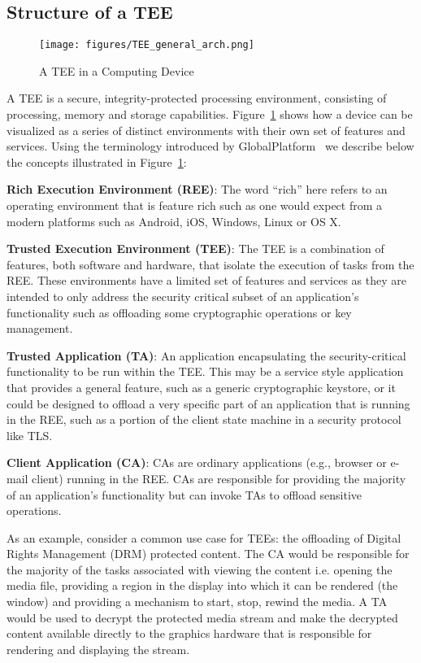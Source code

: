 \documentclass[10pt,conference,letterpaper]{IEEEtran}
\begin{document}
\subsection{Structure  of a TEE}
\begin{figure}[tb]
\centering
\texttt{[image: figures/TEE\_general\_arch.png]}
\caption{A TEE in a Computing Device}
\label{fig:teearch}
\end{figure}

A TEE is a secure, integrity-protected processing environment, consisting of processing, memory and storage capabilities. Figure~\ref{fig:teearch} shows how a device can be visualized as a series of distinct environments with their own set of features and services. Using the terminology introduced by GlobalPlatform~\cite{web:GP_TEE_SA} we describe below the concepts illustrated in Figure~\ref{fig:teearch}:

\noindent\textbf{Rich Execution Environment (REE)}: The word ``rich'' here refers to an operating environment that is feature rich such as one would expect from a modern platforms such as Android, iOS, Windows, Linux or OS X.  

\noindent\textbf{Trusted Execution Environment (TEE)}: The TEE is a combination of features, both software and hardware, that isolate the execution of tasks from the REE.  These environments have a limited set of features and services as they are intended to only address the security critical subset of an application's functionality such as offloading some cryptographic operations or key management.

\noindent\textbf{Trusted Application (TA)}: An application encapsulating the security-critical functionality to be run within the TEE. This may be a service style application that provides a general feature, such as a generic cryptographic keystore, or it could be designed to offload a very specific part of an application that is running in the REE, such as a portion of the client state machine in a security protocol like TLS.

\noindent\textbf{Client Application (CA)}: CAs are ordinary applications (e.g., browser or e-mail client) running in the REE. CAs are responsible for providing the majority of an application's functionality but can invoke TAs to offload sensitive operations.

As an example, consider a common use case for TEEs: the offloading of Digital Rights Management (DRM) protected content. The CA would be responsible for the majority of the tasks associated with viewing the content i.e. opening the media file, providing a region in the display into which it can be rendered (the window) and providing a mechanism to start, stop, rewind the media.  A TA would be used to decrypt the protected media stream and make the decrypted content available directly to the graphics hardware that is responsible for rendering and displaying the stream. 
\end{document}

